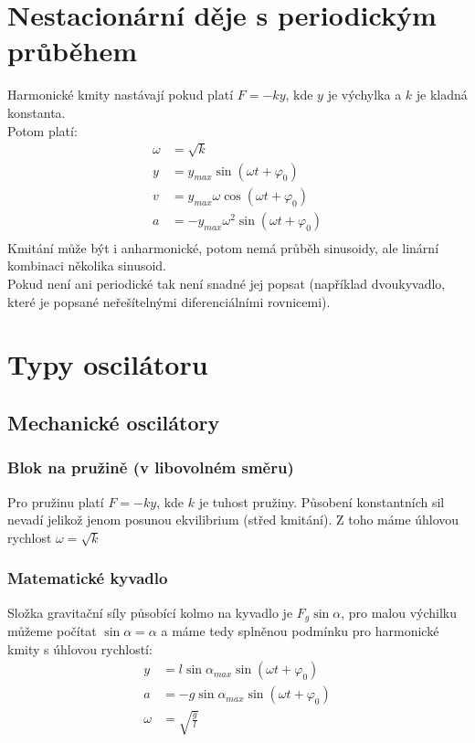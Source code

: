\documentclass[titlepage]{book}
\begin{document}
\section{Nestacionární děje s periodickým průběhem}
Harmonické kmity nastávají pokud platí $F = -ky$, kde $y$ je výchylka a $k$ je kladná konstanta.\\
Potom platí:\\
\begin{align}
\omega &= \sqrt{k}\\
y &= y_{max}\sin(\omega t + \varphi_0)\\
v &= y_{max}\omega \cos(\omega t + \varphi_0)\\
a &= -y_{max}\omega^2 \sin(\omega t + \varphi_0)\\
\end{align}
Kmitání může být i anharmonické, potom nemá průběh sinusoidy, ale linární kombinaci několika sinusoid.\\
Pokud není ani periodické tak není snadné jej popsat (například dvoukyvadlo, které je popsané neřešítelnými diferenciálními rovnicemi).
\section{Typy oscilátoru}
\subsection{Mechanické oscilátory}
\subsubsection{Blok na pružině (v libovolném směru)}
Pro pružinu platí $F = -ky$, kde $k$ je tuhost pružiny. Působení konstantních sil nevadí jelikož jenom posunou ekvilibrium (střed kmitání). Z toho máme úhlovou rychlost $\omega = \sqrt{k}$\\
\subsubsection{Matematické kyvadlo}
Složka gravitační síly působící kolmo na kyvadlo je $F_g \sin \alpha$, pro malou výchilku můžeme počítat $\sin \alpha = \alpha$ a máme tedy splněnou podmínku pro harmonické kmity s úhlovou rychlostí:
\begin{align}
y &= l \sin \alpha_{max} \sin(\omega t + \varphi_0)\\
a &= - g \sin \alpha_{max} \sin(\omega t + \varphi_0)\\
\omega &= \sqrt{\frac{g}{l}}
\end{align}
\end{document}
